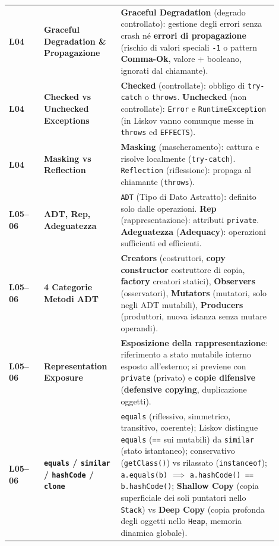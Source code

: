 \begin{longtable}{>{\raggedright\arraybackslash}p{0.12\linewidth}>{\raggedright\arraybackslash}p{0.24\linewidth}>{\raggedright\arraybackslash}p{0.54\linewidth}}
\textbf{L04} & \textbf{Graceful Degradation \& Propagazione} & \textbf{Graceful Degradation} (degrado controllato): gestione degli errori senza crash né \textbf{errori di propagazione} (rischio di valori speciali \texttt{-1} o pattern \textbf{Comma-Ok}, valore + booleano, ignorati dal chiamante). \\

\textbf{L04} & \textbf{Checked vs Unchecked Exceptions} & \textbf{Checked} (controllate): obbligo di \texttt{try-catch} o \texttt{throws}. \textbf{Unchecked} (non controllate): \texttt{Error} e \texttt{RuntimeException} (in Liskov vanno comunque messe in \texttt{throws} ed \texttt{EFFECTS}). \\

\textbf{L04} & \textbf{Masking vs Reflection} & \textbf{Masking} (mascheramento): cattura e risolve localmente (\texttt{try-catch}). \texttt{Reflection} (riflessione): propaga al chiamante (\texttt{throws}). \\

\textbf{L05–06} & \textbf{ADT, Rep, Adeguatezza} & \texttt{ADT} (Tipo di Dato Astratto): definito solo dalle operazioni. \textbf{Rep} (rappresentazione): attributi \texttt{private}. \textbf{Adeguatezza} (\textbf{Adequacy}): operazioni sufficienti ed efficienti. \\

\textbf{L05–06} & \textbf{4 Categorie Metodi ADT} & \textbf{Creators} (costruttori, \textbf{copy constructor} costruttore di copia, \textbf{factory} creatori statici), \textbf{Observers} (osservatori), \textbf{Mutators} (mutatori, solo negli ADT mutabili), \textbf{Producers} (produttori, nuova istanza senza mutare operandi). \\

\textbf{L05–06} & \textbf{Representation Exposure} & \textbf{Esposizione della rappresentazione}: riferimento a stato mutabile interno esposto all'esterno; si previene con \texttt{private} (privato) e \textbf{copie difensive} (\textbf{defensive copying}, duplicazione oggetti). \\

\textbf{L05–06} & \textbf{\texttt{equals} / \texttt{similar} / \texttt{hashCode} / \texttt{clone}} & \texttt{equals} (riflessivo, simmetrico, transitivo, coerente); Liskov distingue \texttt{equals} (\texttt{==} sui mutabili) da \texttt{similar} (stato istantaneo); conservativo (\texttt{getClass()}) vs rilassato (\texttt{instanceof}); \texttt{a.equals(b)} $\implies$ \texttt{a.hashCode() == b.hashCode()}; \textbf{Shallow Copy} (copia superficiale dei soli puntatori nello \texttt{Stack}) vs \textbf{Deep Copy} (copia profonda degli oggetti nello \texttt{Heap}, memoria dinamica globale). \\


\end{longtable}
